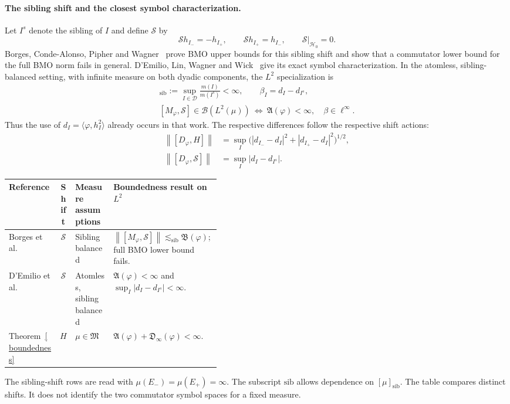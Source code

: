 \documentclass[11pt]{amsart}
\newcommand{\D}{\mathcal D}
\newcommand{\norm}[1]{\left\|#1\right\|}
\begin{document}
\paragraph{The sibling shift and the closest symbol characterization.}
Let $I^s$ denote the sibling of $I$ and define $\mathcal S$ by
\[
 \mathcal S h_{I_-}=-h_{I_+},\qquad
 \mathcal S h_{I_+}=h_{I_-},\qquad
 \mathcal S|_{\mathcal H_0}=0.
\]
Borges, Conde-Alonso, Pipher and Wagner~\cite[Theorem A]{BCAPW2025}
prove BMO upper bounds for this sibling shift and show that a
commutator lower bound for the full BMO norm fails in general.
D'Emilio, Lin, Wagner and Wick~\cite[Theorem D; Theorem 4.7]{DELWW2025}
give its exact symbol characterization. In the atomless,
sibling-balanced setting, with infinite measure on both dyadic
components, the $L^2$ specialization is
\begin{gather*}
 [\mu]_{\mathrm{sib}}
    :=\sup_{I\in\D}\frac{m(I)}{m(I^s)}<\infty,\qquad
 \beta_I=d_I-d_{I^s},\\
 [M_\varphi,\mathcal S]\in\mathcal B(L^2(\mu))
 \ \Longleftrightarrow\
 \mathfrak A(\varphi)<\infty,\quad\beta\in\ell^\infty.
\end{gather*}
Thus the use of $d_I=\langle\varphi,h_I^2\rangle$ already occurs
in that work. The respective differences follow the respective
shift actions:
\[
 \begin{aligned}
 \norm{[D_\varphi,H]}
    &=\sup_I\big(|d_{I_-}-d_I|^2+|d_{I_+}-d_I|^2\big)^{1/2},\\
 \norm{[D_\varphi,\mathcal S]}
    &=\sup_I|d_I-d_{I^s}|.
 \end{aligned}
\]
\begin{center}
\small
\begin{tabularx}{\linewidth}{@{}>{\raggedright\arraybackslash}p{0.24\linewidth}c
 >{\raggedright\arraybackslash}p{0.18\linewidth}
 >{\raggedright\arraybackslash}X@{}}
\toprule
Reference & Shift & Measure assumptions & Boundedness result on $L^2$\\
\midrule
Borges et al.\ \cite{BCAPW2025}
 & $\mathcal S$ & Sibling balanced
 & $\norm{[M_\varphi,\mathcal S]}\lesssim_{\mathrm{sib}}\mathfrak B(\varphi)$;
   full BMO lower bound fails.\\
D'Emilio et al.\ \cite{DELWW2025}
 & $\mathcal S$ & Atomless, sibling balanced
 & $\mathfrak A(\varphi)<\infty$ and
   $\sup_I|d_I-d_{I^s}|<\infty$.\\
Theorem~\ref{boundedness}
 & $H$ & $\mu\in\mathfrak M$
 & $\mathfrak A(\varphi)+\mathfrak D_\infty(\varphi)<\infty$.\\
\bottomrule
\end{tabularx}
\end{center}
The sibling-shift rows are read with $\mu(E_-)=\mu(E_+)=\infty$.
The subscript $\mathrm{sib}$ allows dependence on $[\mu]_{\mathrm{sib}}$.
The table compares distinct shifts. It does not identify the two
commutator symbol spaces for a fixed measure.
\end{document}
